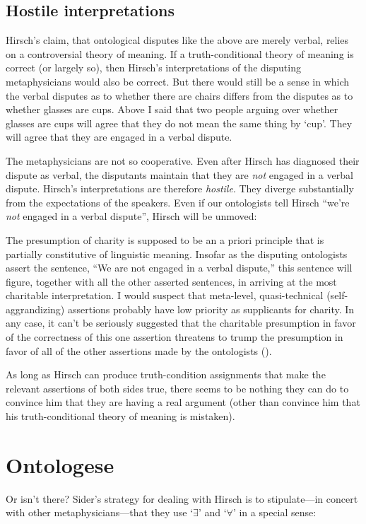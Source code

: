 \documentclass[11pt]{article}
\newenvironment{squote}{%
\begin{spacing}{1}
       	\begin{list}{}{%
\setlength{\labelwidth}{0pt}%
\rightmargin\leftmargin%
}
\item\relax
}{%
\end{list}%
\end{spacing}
}
\begin{document}
\begin{spacing}{1.25}
\subsection{Hostile interpretations}
Hirsch's claim, that ontological disputes like the above are merely
verbal, relies on a controversial theory of meaning.  If a
truth-conditional theory of meaning is correct (or largely so), then
Hirsch's interpretations of the disputing metaphysicians would also be
correct.  But there would still be a sense in which the verbal
disputes as to whether there are chairs differs from the disputes as
to whether glasses are cups.  Above I said that two people arguing
over whether glasses are cups will agree that they do not mean the
same thing by `cup'.  They will agree that they are engaged in a
verbal dispute.

The metaphysicians are not so cooperative.  Even after Hirsch has
diagnosed their dispute as verbal, the disputants maintain that they
are {\em not} engaged in a verbal dispute.  Hirsch's interpretations
are therefore \emph{hostile}.  They diverge substantially from the
expectations of the speakers.  Even if our ontologists tell Hirsch
``we're \emph{not} engaged in a verbal dispute'', Hirsch will be
unmoved:

\begin{squote}
The presumption of charity is supposed to be an a priori principle
that is partially constitutive of linguistic meaning.  Insofar as the
disputing ontologists assert the sentence, ``We are not engaged in a
verbal dispute,'' this sentence will figure, together with all the
other asserted sentences, in arriving at the most charitable
interpretation.  I would suspect that meta-level, quasi-technical
(self-aggrandizing) assertions probably have low priority as
supplicants for charity.  In any case, it can't be seriously suggested
that the charitable presumption in favor of the correctness of this
one assertion threatens to trump the presumption in favor of all of
the other assertions made by the ontologists (\citeyear{hirsch2008}).
\end{squote}

As long as Hirsch can produce truth-condition assignments that make
the relevant assertions of both sides true, there seems to be nothing
they can do to convince him that they are having a real argument
(other than convince him that his truth-conditional theory of meaning
is mistaken).

\section{Ontologese}
\label{ontologese}
Or isn't there?  Sider's strategy for dealing with Hirsch is to
stipulate---in concert with other metaphysicians---that they use
`$\exists$' and `$\forall$' in a special sense:


\end{spacing}
\end{document}
